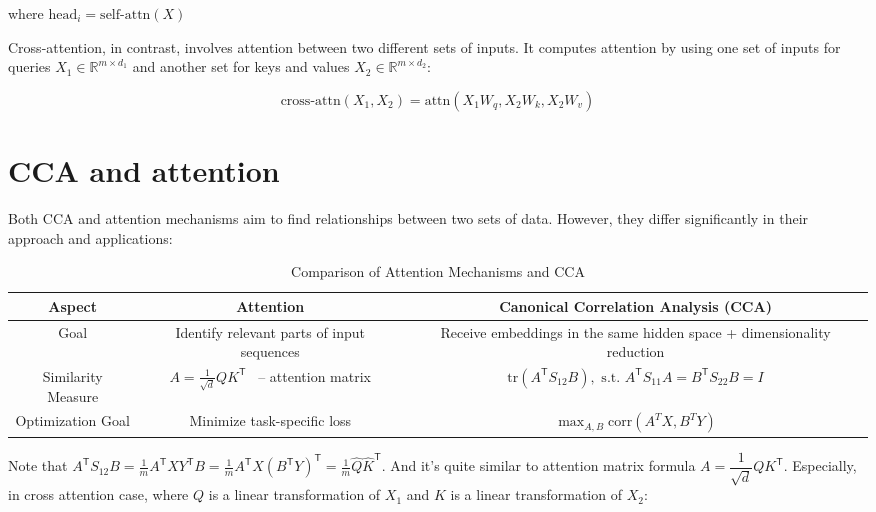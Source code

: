 \documentclass[a4paper,14pt]{article}
\newcommand{\dR}{\mathbb{R}}
\newcommand{\T}{^{\mathsf{T}}}
\theoremstyle{plain} %
\theoremstyle{definition} %
\theoremstyle{remark} %
\begin{document}
	where $\text{head}_i = \text{self-attn}(X)$
	
	Cross-attention, in contrast, involves attention between two different sets of inputs. It computes attention by using one set of inputs for queries $X_1 \in \dR^{m \times d_1}$ and another set for keys and values $X_2 \in \dR^{m \times d_2}$:
	
	\begin{equation}
		\text{cross-attn}(X_1, X_2) = \text{attn}(X_1 W_q, X_2 W_k, X_2 W_v) \label{cross-attn}
	\end{equation}

        \section*{CCA and attention}
	
	Both CCA and attention mechanisms aim to find relationships between two sets of data. However, they differ significantly in their approach and applications:
	
	\setlength{\extrarowheight}{3mm}
	
	\begin{table}[bhtp]
		\centering
		\begin{tabulary}{\textwidth}{|C|C|C|}
			\hline
			\textbf{Aspect} & \textbf{Attention} & \textbf{Canonical Correlation Analysis (CCA)} \\ 
			\hline
			Goal & Identify relevant parts of input sequences & Receive embeddings in the same hidden space + dimensionality reduction \\
			\hline
			Similarity Measure & $A = \frac{1}{\sqrt{d}} Q K\T$ ~-- attention matrix & $\text{tr}(A\T S_{12} B), \text{ s.t. } A\T S_{11} A = B\T S_{22} B = I$ \\
			\hline
			Optimization Goal & Minimize task-specific loss & $\max_{A,B} \text{corr}(A^T X, B^T Y)$ \\
			\hline
		\end{tabulary}
		\caption{Comparison of Attention Mechanisms and CCA}
	\end{table}
	
	Note that $A\T S_{12} B = \frac{1}{m} A\T X Y\T B = \frac{1}{m} A\T X \left( B\T Y \right)\T = \frac{1}{m} \widehat{Q} \widehat{K}\T $. And it's quite similar to attention matrix formula $A = \dfrac{1}{\sqrt{d}} Q K\T$. Especially, in cross attention case, where $Q$ is a linear transformation of $X_1$ and $K$ is a linear transformation of $X_2$:
	
\end{document}
